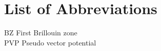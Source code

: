 \chapter*{List of Abbreviations}

\noindent

BZ \hfill First Brillouin zone \\

PVP \hfill Pseudo vector potential \\

\newpage